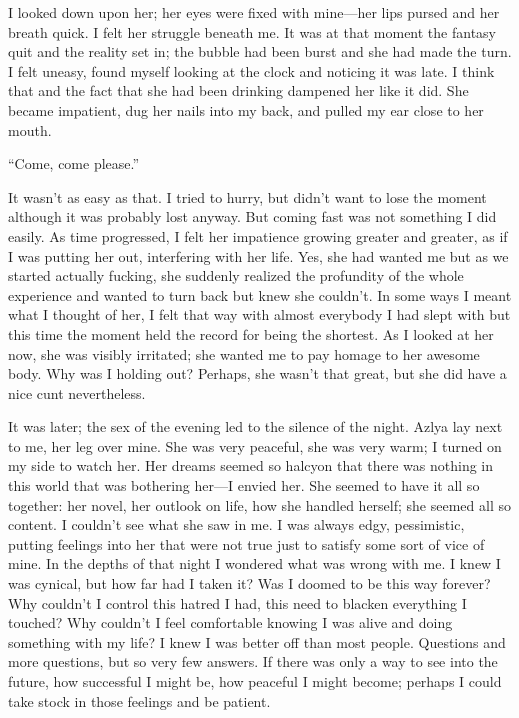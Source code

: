 I looked down upon her; her eyes were fixed with mine---her lips pursed
and her breath quick. I felt her struggle beneath me. It was at that
moment the fantasy quit and the reality set in; the bubble had been
burst and she had made the turn. I felt uneasy, found myself looking at
the clock and noticing it was late. I think that and the fact that she
had been drinking dampened her like it did. She became impatient, dug
her nails into my back, and pulled my ear close to her mouth.

``Come, come please.''

It wasn't as easy as that. I tried to hurry, but didn't want to lose the
moment although it was probably lost anyway. But coming fast was not
something I did easily. As time progressed, I felt her impatience
growing greater and greater, as if I was putting her out, interfering
with her life. Yes, she had wanted me but as we started actually
fucking, she suddenly realized the profundity of the whole experience
and wanted to turn back but knew she couldn't. In some ways I meant what
I thought of her, I felt that way with almost everybody I had slept with
but this time the moment held the record for being the shortest. As I
looked at her now, she was visibly irritated; she wanted me to pay
homage to her awesome body. Why was I holding out? Perhaps, she wasn't
that great, but she did have a nice cunt nevertheless.

It was later; the sex of the evening led to the silence of the night.
Azlya lay next to me, her leg over mine. She was very peaceful, she was
very warm; I turned on my side to watch her. Her dreams seemed so
halcyon that there was nothing in this world that was bothering her---I
envied her. She seemed to have it all so together: her novel, her
outlook on life, how she handled herself; she seemed all so content. I
couldn't see what she saw in me. I was always edgy, pessimistic, putting
feelings into her that were not true just to satisfy some sort of vice
of mine. In the depths of that night I wondered what was wrong with me.
I knew I was cynical, but how far had I taken it? Was I doomed to be
this way forever? Why couldn't I control this hatred I had, this need to
blacken everything I touched? Why couldn't I feel comfortable knowing I
was alive and doing something with my life? I knew I was better off than
most people. Questions and more questions, but so very few answers. If
there was only a way to see into the future, how successful I might be,
how peaceful I might become; perhaps I could take stock in those
feelings and be patient.

